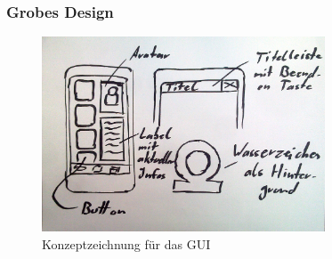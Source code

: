 \begin{frame}
	\frametitle{Grobes Design}
	\begin{figure}
		\centering
		\includegraphics[width = 0.75\textwidth]{gui-design}
		\caption{Konzeptzeichnung für das GUI}
	\end{figure}
\end{frame}
%
%
%
%
